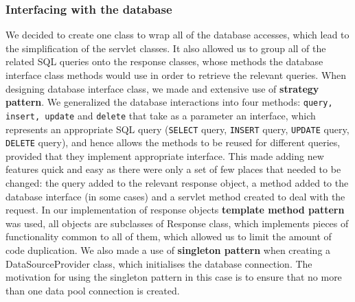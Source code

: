 \documentclass[10pt,a4paper]{article}
\begin{document}
\subsubsection{Interfacing with the database}
\noindent We decided to create one class to wrap all of the database accesses, 
which lead to the simplification of the servlet classes. It also allowed us to 
group all of the related SQL queries onto the response classes, whose methods 
the database interface class methods would use in order to retrieve the relevant 
queries. When designing database interface class, we made and extensive use of 
\textbf{strategy pattern}. We generalized the database interactions into four 
methods: \verb|query, insert, update| and \verb|delete| that take as a parameter 
an interface, which represents an appropriate SQL query (\verb|SELECT| query, 
\verb|INSERT| query, \verb|UPDATE| query, \verb|DELETE| query), and hence allows 
the methods to be reused for different queries, provided that they implement 
appropriate interface. This made adding new features quick and easy as there 
were only a set of few places that needed to be changed: the query added to the 
relevant response object, a method added to the database interface (in some 
cases) and a servlet method created to deal with the request. In our 
implementation of response objects \textbf{template method pattern} was used, all 
objects are subclasses of Response class, which implements pieces of 
functionality common to all of them, which allowed us to limit the amount of 
code duplication. We also made a use of \textbf{singleton pattern} when creating 
a DataSourceProvider class, which initialises the database connection. The 
motivation for using the singleton pattern in this case is to ensure that no 
more than one data pool connection is created. 
\end{document}
